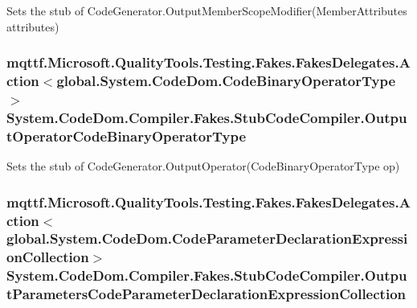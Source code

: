 Sets the stub of Code\-Generator.\-Output\-Member\-Scope\-Modifier(\-Member\-Attributes attributes)

\hypertarget{class_system_1_1_code_dom_1_1_compiler_1_1_fakes_1_1_stub_code_compiler_a907995b38814ecfface3f12f28f2ed80}{
\subsubsection[{Output\-Operator\-Code\-Binary\-Operator\-Type}]{\setlength{\rightskip}{0pt plus 5cm}mqttf.\-Microsoft.\-Quality\-Tools.\-Testing.\-Fakes.\-Fakes\-Delegates.\-Action$<$global.\-System.\-Code\-Dom.\-Code\-Binary\-Operator\-Type$>$ System.\-Code\-Dom.\-Compiler.\-Fakes.\-Stub\-Code\-Compiler.\-Output\-Operator\-Code\-Binary\-Operator\-Type}}\label{class_system_1_1_code_dom_1_1_compiler_1_1_fakes_1_1_stub_code_compiler_a907995b38814ecfface3f12f28f2ed80}


Sets the stub of Code\-Generator.\-Output\-Operator(\-Code\-Binary\-Operator\-Type op)

\hypertarget{class_system_1_1_code_dom_1_1_compiler_1_1_fakes_1_1_stub_code_compiler_afe740bb98422748abd09c08a7d42109e}{
\subsubsection[{Output\-Parameters\-Code\-Parameter\-Declaration\-Expression\-Collection}]{\setlength{\rightskip}{0pt plus 5cm}mqttf.\-Microsoft.\-Quality\-Tools.\-Testing.\-Fakes.\-Fakes\-Delegates.\-Action$<$global.\-System.\-Code\-Dom.\-Code\-Parameter\-Declaration\-Expression\-Collection$>$ System.\-Code\-Dom.\-Compiler.\-Fakes.\-Stub\-Code\-Compiler.\-Output\-Parameters\-Code\-Parameter\-Declaration\-Expression\-Collection}}\label{class_system_1_1_code_dom_1_1_compiler_1_1_fakes_1_1_stub_code_compiler_afe740bb98422748abd09c08a7d42109e}


